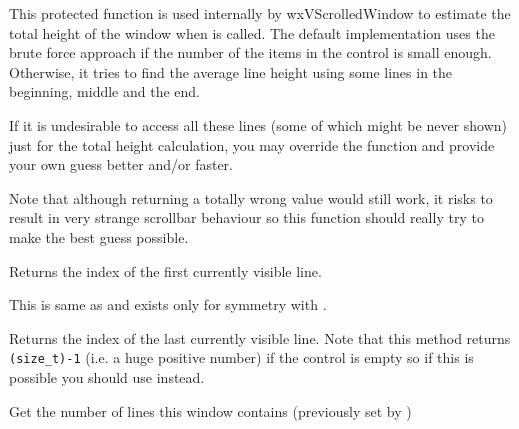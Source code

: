 
This protected function is used internally by wxVScrolledWindow to estimate the
total height of the window when 
is called. The default implementation uses the brute force approach if the
number of the items in the control is small enough. Otherwise, it tries to find
the average line height using some lines in the beginning, middle and the end.

If it is undesirable to access all these lines (some of which might be never
shown) just for the total height calculation, you may override the function and
provide your own guess better and/or faster.

Note that although returning a totally wrong value would still work, it risks
to result in very strange scrollbar behaviour so this function should really
try to make the best guess possible.


\label{wxvscrolledwindowgetfirstvisibleline}


Returns the index of the first currently visible line.

This is same as  and
exists only for symmetry with .


\label{wxvscrolledwindowgetlastvisibleline}


Returns the index of the last currently visible line. Note that this method
returns \texttt{(size\_t)-1} (i.e. a huge positive number) if the control is
empty so if this is possible you should use 
instead.




\label{wxvscrolledwindowgetlinecount}


Get the number of lines this window contains (previously set by
)


